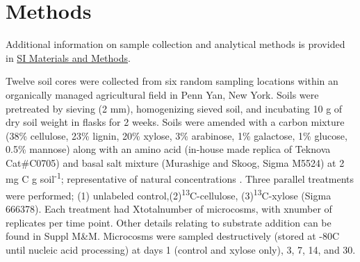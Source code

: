 \section{Methods}
Additional information on sample collection and analytical methods is provided in \href{https://www.authorea.com/users/3537/articles/8459/_show_article}{SI Materials and Methods}.


Twelve soil cores were collected from six random sampling locations within an organically managed agricultural field in Penn Yan, New York. Soils were pretreated by sieving (2 mm), homogenizing sieved soil, and incubating 10 g of dry soil weight in flasks for 2 weeks. Soils were amended with a carbon mixture (38\% cellulose, 23\% lignin, 20\% xylose, 3\% arabinose, 1\% galactose, 1\% glucose, 0.5\% mannose) along with an amino acid (in-house made replica of Teknova Cat#C0705) and basal salt mixture (Murashige and Skoog, Sigma M5524) at 2 mg C g soil\textsuperscript{-1}; representative of natural concentrations \cite{Schneckenberger_2008}. Three parallel treatments were performed; (1) unlabeled control,(2)\textsuperscript{13}C-cellulose, (3)\textsuperscript{13}C-xylose (Sigma 
666378). Each treatment had Xtotalnumber of microcosms, with xnumber of replicates per time point. Other details relating to substrate addition can be found in Suppl M&M. Microcosms were sampled destructively (stored at -80{\textdegree}C until nucleic acid processing) at days 1 (control and xylose only), 3, 7, 14, and 30.



